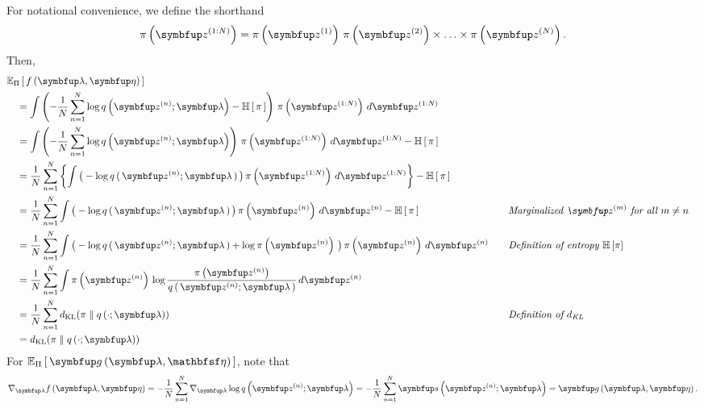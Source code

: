 \begin{proofEnd}
  For notational convenience, we define the shorthand
  \begin{align*}
    \pi\left(\vz^{(1:N)}\right) = \pi\left(\vz^{(1)}\right) \, \pi\left(\vz^{(2)}\right) \times \ldots \times \pi\left(\vz^{(N)}\right).
  \end{align*}
  Then,
  \begin{alignat}{2}
    &\Esub{\Pi}{ f\left(\vlambda, \veta\right) }
    \nonumber
    \\
    &\quad=
    \int \left(- \frac{1}{N} \sum^{N}_{n=1} \log q\left(\vz^{(n)}; \vlambda\right) - \mathbb{H}\left[\,\pi\,\right]\right) \, \pi\left(\vz^{(1:N)}\right) \, d\vz^{(1:N)}
    \nonumber
    \\
    &\quad=
    \int \left(- \frac{1}{N} \sum^{N}_{n=1} \log q\left(\vz^{(n)}; \vlambda\right)\right) \, \pi\left(\vz^{(1:N)}\right) \, d\vz^{(1:N)} - \mathbb{H}\left[\,\pi\,\right]
    \nonumber
    \\
    &\quad=
     \frac{1}{N} \sum^{N}_{n=1} \left\{ \int \big(-\log q\,(\,\vz^{(n)}; \vlambda\,)\,\big) \, \pi\left(\vz^{(1:N)}\right) \, d\vz^{(1:N)} \right\} - \mathbb{H}\,[\,\pi\,] 
    \nonumber
    \\
    &\quad=
    \frac{1}{N} \sum^{N}_{n=1} \int \big( -\log q\,(\,\vz^{(n)}; \vlambda\,) \,\big) \, \pi\left(\vz^{(n)}\right) \, d\vz^{(n)} - \mathbb{H}\,[\,\pi\,]
    &&\quad{\text{\textit{Marginalized \(\vz^{(m)}\) for all \(m \neq n\)}}}
    \nonumber
    \\
    &\quad=
    \frac{1}{N} \sum^{N}_{n=1} \int \big( -\log q\,(\,\vz^{(n)}; \vlambda\,) + \log\pi\left(\vz^{(n)}\right) \,\big) \, \pi\left(\vz^{(n)}\right) \, d\vz^{(n)}
    &&\quad{\text{\textit{Definition of entropy \(\mathbb{H}\left[\pi\right]\)}}}
    \nonumber
    \\
    &\quad=
    \frac{1}{N} \sum^{N}_{n=1} \int \pi\left(\vz^{(n)}\right) \, \log \frac{\pi\left(\vz^{(n)}\right)}{q\,(\,\vz^{(n)}; \vlambda\,)}  \, d\vz^{(n)}
    \nonumber
    \\
    &\quad=
    \frac{1}{N} \sum^{N}_{n=1} \DKL{\pi}{q\left(\cdot; \vlambda\right)}
    \nonumber
    &&\quad{\text{\textit{Definition of \(d_{\text{KL}}\)}}}
    \\
    &\quad=
    \DKL{\pi}{q\left(\cdot; \vlambda\right)}\label{eq:F_KL}
  \end{alignat}
  For \(\Esub{\Pi}{ \vg\left(\vlambda, \rvveta\right) }\), note that 
  \begin{align}
    \nabla_{\vlambda} f\left(\vlambda, \veta\right) = -\frac{1}{N} \sum^{N}_{n=1} \nabla_{\vlambda} \log q\left(\vz^{(n)}; \vlambda\right) = -\frac{1}{N} \sum^{N}_{n=1} \vs\left(\vz^{(n)}; \vlambda\right) = \vg\left(\vlambda, \veta\right).\label{eq:F_grad_G}

\end{align}
\end{proofEnd}
